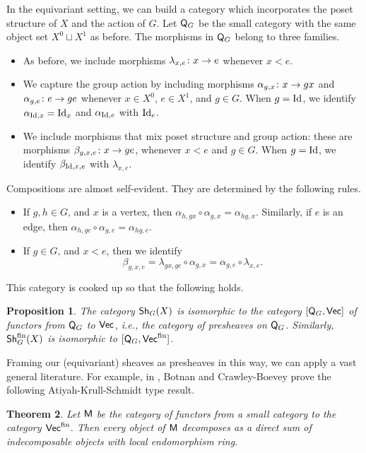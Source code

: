 \documentclass[letter]{amsart}
\newtheorem{thm}{Theorem}[section]
\newtheorem{proposition}[thm]{Proposition}
\theoremstyle{definition}
\theoremstyle{remark}
\numberwithin{thm}{section}
\numberwithin{equation}{section}
\begin{document}
In the equivariant setting, we can build a category which incorporates the poset structure of $X$ and the action of $G$.  Let ${\mathsf{Q}}_G$ be the small category with the same object set $X^0 \sqcup X^1$ as before.  The morphisms in ${\mathsf{Q}}_G$ belong to three families.  
\begin{itemize}
\item
As before, we include morphisms $\lambda_{x,e} \colon x \rightarrow e$ whenever $x < e$. 
\item
We capture the group action by including morphisms $\alpha_{g,x} \colon x \rightarrow gx$ and $\alpha_{g,e} \colon e \rightarrow ge$ whenever $x \in X^0$, $e \in X^1$, and $g \in G$.  When $g = \operatorname{Id}$, we identify $\alpha_{\operatorname{Id}, x} = \operatorname{Id}_x$ and $\alpha_{\operatorname{Id}, e}$ with $\operatorname{Id}_e$. 
\item
We include morphisms that mix poset structure and group action:  these are morphisms $\beta_{g,x,e} \colon x \rightarrow ge$, whenever $x < e$ and $g \in G$.  When $g = \operatorname{Id}$, we identify $\beta_{\operatorname{Id}, x, e}$ with $\lambda_{x,e}$.    
\end{itemize}
Compositions are almost self-evident.  They are determined by the following rules.
\begin{itemize}
\item
If $g,h \in G$, and $x$ is a vertex, then $\alpha_{h, gx} \circ \alpha_{g,x} = \alpha_{hg,x}$.  Similarly, if $e$ is an edge, then $\alpha_{h, ge} \circ \alpha_{g,e} = \alpha_{hg, e}$.  
\item
If $g \in G$, and $x < e$, then we identify
$$\beta_{g,x,e} = \lambda_{gx, ge} \circ \alpha_{g,x} = \alpha_{g,e} \circ \lambda_{x,e}.$$
\end{itemize}

This category is cooked up so that the following holds.
\begin{proposition}
The category ${\mathsf{Sh}}_G(X)$ is isomorphic to the category $[{\mathsf{Q}}_G, {\mathsf{Vec}}]$ of functors from ${\mathsf{Q}}_G$ to ${\mathsf{Vec}}$, i.e., the category of presheaves on ${\mathsf{Q}}_G$.  Similarly, ${\mathsf{Sh}}_G^{\operatorname{fin}}(X)$ is isomorphic to $[{\mathsf{Q}}_G, {\mathsf{Vec}}^{\operatorname{fin}}]$. 
\end{proposition}
 
 Framing our (equivariant) sheaves as presheaves in this way, we can apply a vast general literature.  For example, in \cite[Theorem 1.1]{BCB}, Botnan and Crawley-Boevey prove the following Atiyah-Krull-Schmidt type result.
\begin{thm}
Let ${\mathsf{M}}$ be the category of functors from a small category to the category ${\mathsf{Vec}}^{\operatorname{fin}}$.  Then every object of ${\mathsf{M}}$ decomposes as a direct sum of indecomposable objects with local endomorphism ring.
\end{thm}
\end{document}
